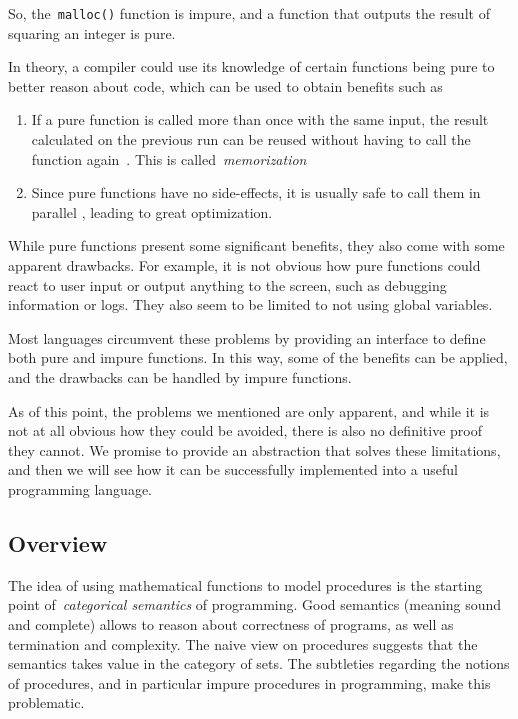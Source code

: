 \documentclass[../TGF.tex]{subfiles}
\begin{document}
So, the~\texttt{malloc()} function is impure, and a function that outputs
the result of squaring an integer is pure.

In theory, a compiler could use its knowledge of certain functions being pure to
better reason about code, which can be used to obtain benefits such as

\begin{enumerate}
    \item If a pure function is called more than once with the
        same input, the result calculated on the previous run can be reused
        without having to call the function again~\cite{frostMemorization}. This
        is called~\emph{memorization}

    \item Since pure functions have no side-effects, it is usually safe to call
        them in parallel \cite{SussPureFunctionParallelization}, leading to
        great optimization.
\end{enumerate}

While pure functions present some significant benefits, they also come with some
apparent drawbacks. For example, it is not obvious how pure functions could
react to user input or output anything to the screen, such as debugging
information or logs. They also seem to be limited to not using global variables.

Most languages circumvent these problems by providing an interface to define
both pure and impure functions. In this way, some of the benefits can be
applied, and the drawbacks can be handled by impure functions.

As of this point, the problems we mentioned are only apparent, and while it is
not at all obvious how they could be avoided, there is also no definitive proof
they cannot. We promise to provide an abstraction that solves these limitations,
and then we will see how it can be successfully implemented into a useful
programming language.

\subsection{Overview}
The idea of using mathematical functions to model procedures is the starting
point of~\emph{categorical semantics} of programming. Good semantics (meaning
sound and complete) allows to reason about correctness of programs, as well as
termination and complexity. The naive view on procedures suggests that the
semantics takes value in the category of sets. The subtleties regarding the
notions of procedures, and in particular impure procedures in programming, make
this problematic.
\end{document}
